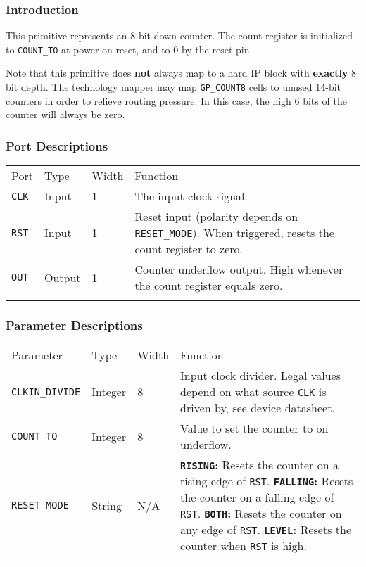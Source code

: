 \documentclass[11pt]{article}
\renewcommand\emph\textbf
\newcommand{\tokenstyle}[1]{\texttt{#1}}
\newcommand{\valuestyle}[1]{\texttt{#1}}
\newcommand{\strvaluestyle}[1]{\valuestyle{\textquotedbl#1\textquotedbl}}
\newcommand{\strexamplestyle}[1]{\textbf{\strvaluestyle{#1}:}}
\newcommand{\whenstyle}[1]{{\fontseries{sb}\selectfont#1}}
\newcommand{\thinhline}{\Xhline{1\arrayrulewidth}}
\newcommand{\thickhline}{\Xhline{2.5\arrayrulewidth}}
\begin{document}
\subsubsection{Introduction}
This primitive represents an 8-bit down counter. The count register is initialized to \tokenstyle{COUNT\_TO} at
power-on reset, and to 0 by the reset pin.

Note that this primitive does \emph{not} always map to a hard IP block with \emph{exactly} 8 bit depth. The technology
mapper may map \tokenstyle{GP\_COUNT8} cells to unused 14-bit counters in order to relieve routing pressure.
In this case, the high 6 bits of the counter will always be zero.

\subsubsection{Port Descriptions}

\begin{tabularx}{\textwidth}{lllX}
\thinhline
\whenstyle{Port} & \whenstyle{Type} & \whenstyle{Width} & \whenstyle{Function} \\
\thickhline
\tokenstyle{CLK} & Input & 1 & The input clock signal. \\
\thinhline
\tokenstyle{RST} & Input & 1 & Reset input (polarity depends on \tokenstyle{RESET\_MODE}).
	When triggered, resets the count register to zero. \\
\thinhline
\tokenstyle{OUT} & Output & 1 & Counter underflow output. High whenever the count register equals zero. \\
\thinhline
\end{tabularx}

\subsubsection{Parameter Descriptions}

\begin{tabularx}{\textwidth}{lllX}
\thinhline
\whenstyle{Parameter} & \whenstyle{Type} & \whenstyle{Width} & \whenstyle{Function} \\
\thickhline
\tokenstyle{CLKIN\_DIVIDE} & Integer & 8 &
	Input clock divider. Legal values depend on what source \tokenstyle{CLK} is driven by, see device datasheet.\\
\thinhline
\tokenstyle{COUNT\_TO} & Integer & 8 & Value to set the counter to on underflow. \\
\thinhline
\tokenstyle{RESET\_MODE} & String & N/A &
	\strexamplestyle{RISING} Resets the counter on a rising edge of \tokenstyle{RST}. \newline
	\strexamplestyle{FALLING} Resets the counter on a falling edge of \tokenstyle{RST}. \newline
	\strexamplestyle{BOTH} Resets the counter on any edge of \tokenstyle{RST}. \newline
	\strexamplestyle{LEVEL} Resets the counter when \tokenstyle{RST} is high. \\
\thinhline
\end{tabularx}
\end{document}
